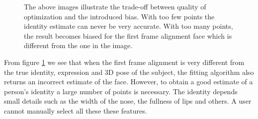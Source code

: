 \documentclass[11pt,a4paper,twoside]{report}
\begin{document}
\begin{figure}[H]
\centering
{}

\caption{The above images illustrate the trade-off between quality of
  optimization and the introduced bias. With too few points the identity
  estimate can never be very accurate. With too many points, the result becomes biased for the
  first frame alignment
  face which is different from the one in the image.}\label{fg:points}
\end{figure}

From figure \ref{fg:points} we see that when the first frame alignment is
very different from the true identity, expression and 3D pose of the subject,
the fitting algorithm also returns an incorrect estimate of the face. However,
to obtain a good estimate of a person's identity a large number of points is
necessary. The identity depends small details such as the width of the nose, the
fullness of lips and others. A user cannot manually select all these these features.
\end{document}
